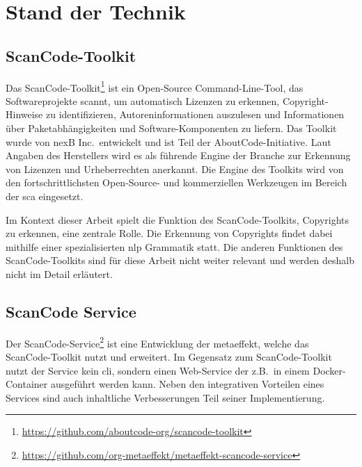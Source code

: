\chapter{Stand der Technik}\label{ch:stand-der-technik}



\section{ScanCode-Toolkit}\label{sec:scancode-toolkit}

Das ScanCode-Toolkit\footnote{\url{https://github.com/aboutcode-org/scancode-toolkit}} ist ein Open-Source Command-Line-Tool, das Softwareprojekte scannt, um automatisch Lizenzen zu erkennen, Copyright-Hinweise zu identifizieren, Autoreninformationen auszulesen und Informationen über Paketabhängigkeiten und Software-Komponenten zu liefern.
Das Toolkit wurde von nexB Inc.\ entwickelt und ist Teil der AboutCode-Initiative.
Laut Angaben des Herstellers wird es als führende Engine der Branche zur Erkennung von Lizenzen und Urheberrechten anerkannt.
Die Engine des Toolkits wird von den fortschrittlichsten Open-Source- und kommerziellen Werkzeugen im Bereich der \gls{sca} eingesetzt.

Im Kontext dieser Arbeit spielt die Funktion des ScanCode-Toolkits, Copyrights zu erkennen, eine zentrale Rolle.
Die Erkennung von Copyrights findet dabei mithilfe einer spezialisierten \gls{nlp} Grammatik statt.
Die anderen Funktionen des ScanCode-Toolkits sind für diese Arbeit nicht weiter relevant und werden deshalb nicht im Detail erläutert\autocite{noauthor_scancode-toolkit-documentation_nodate}.


\section{ScanCode Service}\label{sec:scancode-service}

Der ScanCode-Service\footnote{\url{https://github.com/org-metaeffekt/metaeffekt-scancode-service}} ist eine Entwicklung der metaeffekt, welche das ScanCode-Toolkit nutzt und erweitert.
Im Gegensatz zum ScanCode-Toolkit nutzt der Service kein \gls{cli}, sondern einen Web-Service der z.B.\ in einem Docker-Container ausgeführt werden kann.
Neben den integrativen Vorteilen eines Services sind auch inhaltliche Verbesserungen Teil seiner Implementierung.

